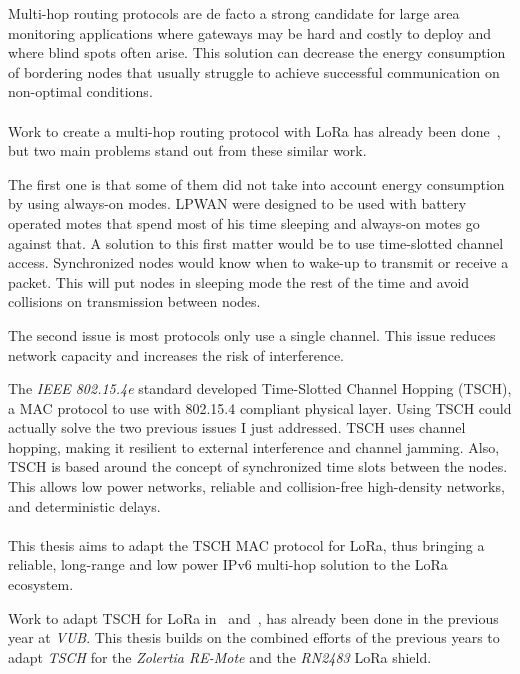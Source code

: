Multi-hop routing protocols are de facto a strong candidate for large area monitoring 
applications where gateways may be hard and costly to deploy and where blind
spots often arise.
This solution can decrease the energy consumption of bordering nodes that
usually struggle to achieve successful communication on non-optimal
conditions.

\paragraph{}

Work to create a multi-hop routing protocol with LoRa has already been
done~\cite{8115756, DIAS2018424, 8856256, Abrardo_2019, duong2018}, 
but two main problems stand out from these similar work.

The first one is that some of them did not take into account energy
consumption by using always-on modes. 
LPWAN were designed to be used with battery operated motes that spend most of
his time sleeping and always-on motes go against that.
A solution to this first matter would be to use time-slotted channel access.
Synchronized nodes would know when to wake-up to transmit or receive a packet.
This will put nodes in sleeping mode the rest of the time and avoid collisions
on transmission between nodes.

The second issue is most protocols only use a single channel. 
This issue reduces network capacity and increases the risk of 
interference.

The \emph{IEEE 802.15.4e} standard developed Time-Slotted Channel Hopping
(TSCH), a MAC protocol to use with 802.15.4 compliant physical layer.
Using TSCH could actually solve the two previous issues I just addressed.
TSCH uses channel hopping, making it resilient to external interference and
channel jamming. 
Also, TSCH is based around the concept of synchronized time slots between the
nodes.
This allows low power networks, reliable and collision-free high-density
networks,
and deterministic delays.

\paragraph{}

This thesis aims to adapt the TSCH MAC protocol for LoRa,
thus bringing a reliable, long-range and low power IPv6 multi-hop
solution to the LoRa ecosystem.

Work to adapt TSCH for LoRa in~\cite{8847137} and~\cite{njomgang_2018}, has
already been done in the previous year at \emph{VUB}.
This thesis builds on the combined efforts of the previous
years to adapt \emph{TSCH} for the \emph{Zolertia RE-Mote} and the
\emph{RN2483} LoRa shield.


